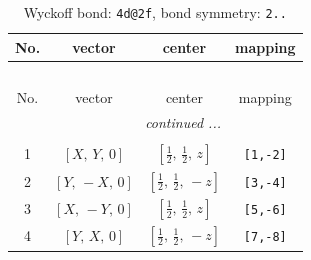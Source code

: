 \documentclass[fleqn,8pt]{jsarticle}
\begin{document}
\renewcommand{\arraystretch}{1.2}
\begin{longtable}{cccc}
\caption{Wyckoff bond: {\tt 4d@2f}, bond symmetry: {\tt 2..}}
 \\
 \hline \hline
No. & vector & center & mapping \\ \hline \endfirsthead

\multicolumn{3}{l}{\tablename\ \thetable{}} \\
 \hline \hline
No. & vector & center & mapping \\ \hline \endhead

 \hline \hline
\multicolumn{3}{r}{\footnotesize\it continued ...} \\ \endfoot

 \hline \hline
\multicolumn{3}{r}{} \\ \endlastfoot

1 & $\left[ X,\, Y,\, 0 \right]$ & $\left[ \frac{1}{2},\, \frac{1}{2},\, z \right]$ & {\tt [1,-2]} \\ \hline
2 & $\left[ Y,\, - X,\, 0 \right]$ & $\left[ \frac{1}{2},\, \frac{1}{2},\, - z \right]$ & {\tt [3,-4]} \\ \hline
3 & $\left[ X,\, - Y,\, 0 \right]$ & $\left[ \frac{1}{2},\, \frac{1}{2},\, z \right]$ & {\tt [5,-6]} \\ \hline
4 & $\left[ Y,\, X,\, 0 \right]$ & $\left[ \frac{1}{2},\, \frac{1}{2},\, - z \right]$ & {\tt [7,-8]} \\
\end{longtable}
\renewcommand{\arraystretch}{1.2}
\end{document}
